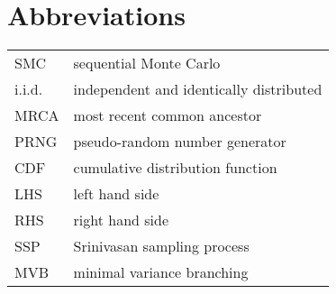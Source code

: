 \documentclass[oneside]{scrbook} %
\theoremstyle{definition}
\newcommand{\1}[1]{\mathbbm{1}_{#1}} %
\begin{document}
%
%
%
%




\tableofcontents
\listoffigures
\listoftables
\listofalgorithms






\chapter{Abbreviations}
\begin{tabular}{p{} p{}}
SMC & sequential Monte Carlo \\
i.i.d. & independent and identically distributed \\
MRCA & most recent common ancestor \\
PRNG & pseudo-random number generator \\
CDF & cumulative distribution function \\
LHS & left hand side \\
RHS & right hand side \\
SSP & Srinivasan sampling process \\
MVB & minimal variance branching \\
\end{tabular}
\end{document}
